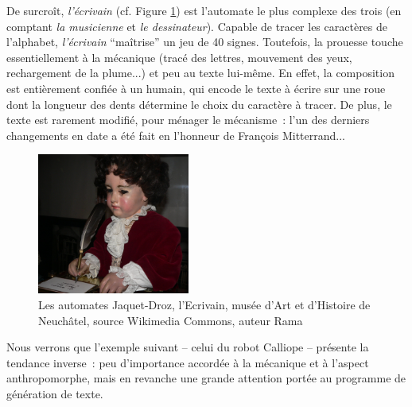 \documentclass{article}
\begin{document}
				De surcroît, \textit{l'écrivain} (cf. Figure \ref{fig:automate_jaquet_droz}) est l'automate le plus complexe des trois (en comptant \textit{la musicienne} et \textit{le dessinateur}). Capable de tracer les caractères de l'alphabet, \textit{l'écrivain} ``maîtrise'' un jeu de 40 signes. Toutefois, la prouesse touche essentiellement à la mécanique (tracé des lettres, mouvement des yeux, rechargement de la plume...) et peu au texte lui-même. En effet, la composition est entièrement confiée à un humain, qui encode le texte à écrire sur une roue dont la longueur des dents détermine le choix du caractère à tracer. De plus, le texte est rarement modifié, pour ménager le mécanisme~: l'un des derniers changements en date a été fait en l'honneur de François Mitterrand...
				\begin{figure}
					\centering
					\includegraphics[width=5cm]{automate_jaquet_droz.jpg}
					\caption{Les automates Jaquet-Droz, l'Ecrivain, musée d'Art et d'Histoire de Neuchâtel, source Wikimedia Commons, auteur Rama}
					\label{fig:automate_jaquet_droz}
				\end{figure}
				Nous verrons que l'exemple suivant -- celui du robot Calliope -- présente la tendance inverse~: peu d'importance accordée à la mécanique et à l'aspect anthropomorphe, mais en revanche une grande attention portée au programme de génération de texte.
\end{document}
